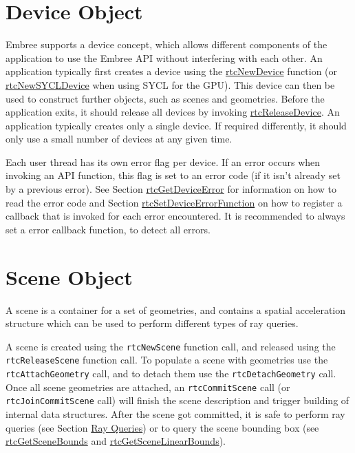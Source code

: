 \section{Device Object}\label{device-object}

Embree supports a device concept, which allows different components of
the application to use the Embree API without interfering with each
other. An application typically first creates a device using the
\hyperref[rtcnewdevice]{rtcNewDevice} function (or
\hyperref[rtcnewsycldevice]{rtcNewSYCLDevice} when using SYCL for the
GPU). This device can then be used to construct further objects, such as
scenes and geometries. Before the application exits, it should release
all devices by invoking \hyperref[rtcreleasedevice]{rtcReleaseDevice}.
An application typically creates only a single device. If required
differently, it should only use a small number of devices at any given
time.

Each user thread has its own error flag per device. If an error occurs
when invoking an API function, this flag is set to an error code (if it
isn't already set by a previous error). See Section
\hyperref[rtcgetdeviceerror]{rtcGetDeviceError} for information on how
to read the error code and Section
\hyperref[rtcsetdeviceerrorfunction]{rtcSetDeviceErrorFunction} on how
to register a callback that is invoked for each error encountered. It is
recommended to always set a error callback function, to detect all
errors.

\section{Scene Object}\label{scene-object}

A scene is a container for a set of geometries, and contains a spatial
acceleration structure which can be used to perform different types of
ray queries.

A scene is created using the \texttt{rtcNewScene} function call, and
released using the \texttt{rtcReleaseScene} function call. To populate a
scene with geometries use the \texttt{rtcAttachGeometry} call, and to
detach them use the \texttt{rtcDetachGeometry} call. Once all scene
geometries are attached, an \texttt{rtcCommitScene} call (or
\texttt{rtcJoinCommitScene} call) will finish the scene description and
trigger building of internal data structures. After the scene got
committed, it is safe to perform ray queries (see Section
\hyperref[ray-queries]{Ray Queries}) or to query the scene bounding box
(see \hyperref[rtcgetscenebounds]{rtcGetSceneBounds} and
\hyperref[rtcgetscenelinearbounds]{rtcGetSceneLinearBounds}).

